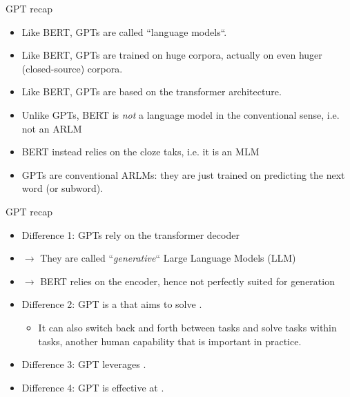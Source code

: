 \documentclass[11pt,compress,t,notes=noshow, xcolor=table]{beamer}
\begin{document}


\begin{frame}{GPT recap}

\vfill

  \begin{itemize}
\item Like BERT, GPTs are called ``language models``.
\item Like BERT, GPTs are trained on huge corpora, actually on even huger (closed-source) corpora.
\item Like BERT, GPTs are based on the transformer architecture.
\item Unlike GPTs, BERT is \textit{not} a language model in the conventional sense, i.e. not an ARLM
\item BERT instead relies on the cloze taks, i.e. it is an MLM
\item GPTs are conventional ARLMs: they are just trained on predicting the next word (or subword).
    \end{itemize}

\vfill

\end{frame}


\begin{frame}{GPT recap}

\vfill

  \begin{itemize}
\item Difference 1: GPTs rely on the transformer decoder
\item[] $\to$ They are called ``\textit{generative}`` Large Language Models (LLM)
\item[] $\to$ BERT relies on the encoder, hence not perfectly suited for generation
\item Difference 2: GPT is a  that aims to solve .  
  \begin{itemize}
    \item It can also switch back and forth between tasks and solve
    tasks within tasks, another human capability that is
    important in practice. 
    \end{itemize}
\item Difference 3: GPT leverages .
\item Difference 4: GPT is effective at .
    \end{itemize}

\vfill

\end{frame}
\end{document}
